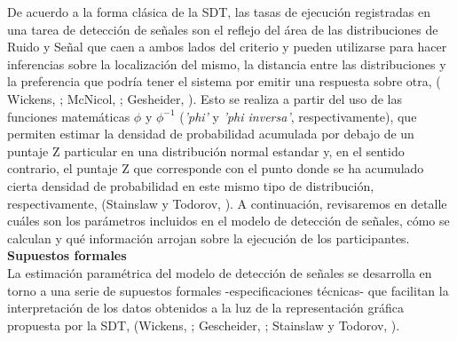 De acuerdo a la forma clásica de la SDT, las tasas de ejecución registradas en una tarea de detección de señales son el reflejo del área de las distribuciones de Ruido y Señal que caen a ambos lados del criterio y pueden utilizarse para hacer inferencias sobre la localización del mismo, la distancia entre las distribuciones y la preferencia que podría tener el sistema por emitir una respuesta sobre otra, ( Wickens, \citeyear{Wickens1}; McNicol, \citeyear{McNicol1}; Gesheider, \citeyear{Gescheider}). Esto se realiza a partir del uso de las funciones matemáticas $\phi$ y $\phi^{-1}$ (\textit{'phi'} y \textit{'phi inversa'}, respectivamente), que permiten estimar la densidad de probabilidad acumulada por debajo de un puntaje Z particular en una distribución normal estandar y, en el sentido contrario, el puntaje Z que corresponde con el punto donde se ha acumulado cierta densidad de probabilidad en este mismo tipo de distribución, respectivamente, (Stainslaw y Todorov, \citeyear{Stainslaw1999}). A continuación, revisaremos en detalle cuáles son los parámetros incluidos en el modelo de detección de señales, cómo se calculan y qué información arrojan sobre la ejecución de los participantes.\\

  \textbf{Supuestos formales}\\

La estimación paramétrica del modelo de detección de señales se desarrolla en torno a una serie de supuestos formales -especificaciones técnicas- que facilitan la interpretación de los datos obtenidos a la luz de la representación gráfica propuesta por la SDT, (Wickens, \citeyear{Wickens1}; Gescheider, \citeyear{Gescheider}; Stainslaw y Todorov, \citeyear{Stainslaw1999}).\\ 

